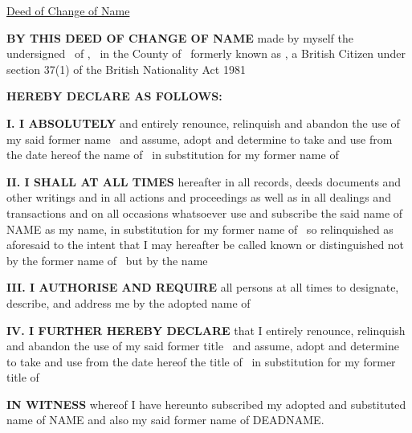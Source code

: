 \documentclass[11pt]{extarticle}
\begin{document}
\newcommand{\dateline}{%
    \ifnum \dayNum=1 1\textsuperscript{st} \else%
    \ifnum \dayNum=2 2\textsuperscript{nd} \else%
    \ifnum \dayNum=3 3\textsuperscript{rd} \else \dayNum \textsuperscript{th} \fi \fi \fi%
    DAY OF \month~IN THE YEAR \year%
}


\begin{center}
    \HUGE\textsf{\underline{Deed of Change of Name}}
\end{center}

\vskip 1cm

\small

\textbf{BY THIS DEED OF CHANGE OF NAME} made by myself the undersigned \name~of \addressLineOne, \addressLineTwo~in the County of \addressLineCounty~formerly known as \deadname, a British Citizen under section 37(1) of the British Nationality Act 1981
\vskip 4mm


\textbf{HEREBY DECLARE AS FOLLOWS:}

\vskip 4mm

\textbf{I. I ABSOLUTELY} and entirely renounce, relinquish and abandon the use of my said former name
\deadname~and assume, adopt and determine to take and use from the date hereof the name of
\name~in substitution for my former name of \deadname

\vskip 4mm

\textbf{II. I SHALL AT ALL TIMES} hereafter in all records, deeds documents and other writings and in all
actions and proceedings as well as in all dealings and transactions and on all occasions whatsoever use and
subscribe the said name of NAME as my name, in substitution for my former name of \deadname~so relinquished as aforesaid to the intent that I may hereafter be called known or distinguished not by the
former name of \deadname~but by the name~\name

\vskip 4mm

\textbf{III. I AUTHORISE AND REQUIRE} all persons at all times to designate, describe, and address me by
the adopted name of \name

\vskip 5mm

\textbf{IV. I FURTHER HEREBY DECLARE} that I entirely renounce, relinquish and abandon the use of my said former title \oldTitle~and assume, adopt and determine to take and use from the date hereof the title of \newTitle~in substitution for my former title of \oldTitle

\vskip 4mm

\textbf{IN WITNESS} whereof I have hereunto subscribed my adopted and substituted name of NAME and also
my said former name of DEADNAME.
\end{document}
